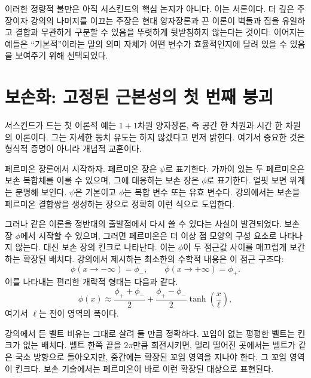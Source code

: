 이러한 정량적 불만은 아직 서스킨드의 핵심 논지가 아니다. 이는 서론이다. 더 깊은 주장이자 강의의 나머지를 이끄는 주장은 현대 양자장론과 끈 이론이 벽돌과 집을 유일하고 결합과 무관하게 구분할 수 있음을 뚜렷하게 뒷받침하지 않는다는 것이다. 이어지는 예들은 ``기본적''이라는 말의 의미 자체가 어떤 변수가 효율적인지에 달려 있을 수 있음을 보여주기 위해 선택되었다.

\section{보손화: 고정된 근본성의 첫 번째 붕괴}

서스킨드가 드는 첫 이론적 예는 \(1+1\)차원 양자장론, 즉 공간 한 차원과 시간 한 차원의 이론이다. 그는 자세한 동치 유도는 하지 않겠다고 먼저 밝힌다. 여기서 중요한 것은 형식적 증명이 아니라 개념적 교훈이다.

페르미온 장론에서 시작하자. 페르미온 장은 \(\psi\)로 표기한다. 가까이 있는 두 페르미온은 보손 복합체를 이룰 수 있으며, 그에 대응하는 보손 장은 \(\phi\)로 표기한다. 얼핏 보면 위계는 분명해 보인다. \(\psi\)은 기본이고 \(\phi\)는 복합 변수 또는 유효 변수다. 강의에서는 보손을 페르미온 결합쌍을 생성하는 장으로 정확히 이런 식으로 도입한다.

그러나 같은 이론을 정반대의 출발점에서 다시 쓸 수 있다는 사실이 발견되었다. 보손 장 \(\phi\)에서 시작할 수 있으며, 그러면 페르미온은 더 이상 점 모양의 구성 요소로 나타나지 않는다. 대신 보손 장의 킨크로 나타난다. 이는 \(\phi\)이 두 점근값 사이를 매끄럽게 보간하는 확장된 배치다. 강의에서 제시하는 최소한의 수학적 내용은 이 점근 구조다:
\begin{equation}
\phi(x\to -\infty)=\phi_-,
\qquad
\phi(x\to +\infty)=\phi_+.
\end{equation}
이를 나타내는 편리한 개략적 형태는 다음과 같다.
\begin{equation}
\phi(x)\approx \frac{\phi_++\phi_-}{2}
+
\frac{\phi_+-\phi_-}{2}\tanh\!\left(\frac{x}{\ell}\right),
\end{equation}
여기서 \(\ell\)는 전이 영역의 폭이다.


강의에서 든 벨트 비유는 그대로 살려 둘 만큼 정확하다. 꼬임이 없는 평평한 벨트는 킨크가 없는 배치다. 벨트 한쪽 끝을 \(2\pi\)만큼 회전시키면, 멀리 떨어진 곳에서는 벨트가 같은 국소 방향으로 돌아오지만, 중간에는 확장된 꼬임 영역을 지나야 한다. 그 꼬임 영역이 킨크다. 보손 기술에서는 페르미온이 바로 이런 확장된 대상으로 표현된다.

